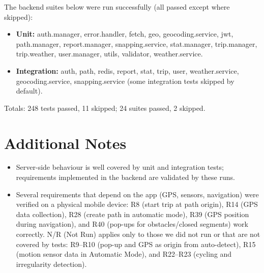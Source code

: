 The backend suites below were run successfully (all passed except where skipped):
\begin{itemize}
    \item \textbf{Unit:} auth.manager, error.handler, fetch, geo, geocoding.service, jwt, path.manager, report.manager, snapping.service, stat.manager, trip.manager, trip.weather, user.manager, utils, validator, weather.service.
    \item \textbf{Integration:} auth, path, redis, report, stat, trip, user, weather.service, geocoding.service, snapping.service (some integration tests skipped by default).
\end{itemize}
Totals: 248 tests passed, 11 skipped; 24 suites passed, 2 skipped.

\section{Additional Notes}
\label{sec:additional_notes}
\begin{itemize}
    \item Server-side behaviour is well covered by unit and integration tests; requirements implemented in the backend are validated by these runs.
    \item Several requirements that depend on the app (GPS, sensors, navigation) were verified on a physical mobile device: R8 (start trip at path origin), R14 (GPS data collection), R28 (create path in automatic mode), R39 (GPS position during navigation), and R40 (pop-ups for obstacles/closed segments) work correctly. N/R (Not Run) applies only to those we did not run or that are not covered by tests: R9--R10 (pop-up and GPS as origin from auto-detect), R15 (motion sensor data in Automatic Mode), and R22--R23 (cycling and irregularity detection).
\end{itemize}

